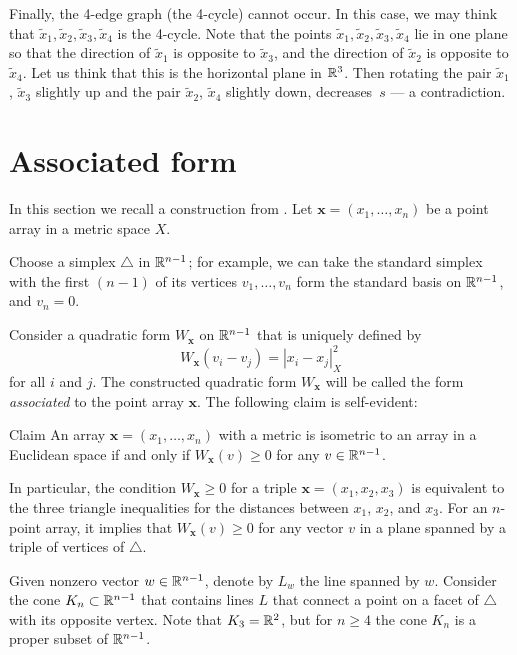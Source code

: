 \documentclass{article}
\begin{document}
Finally, the 4-edge graph (the 4-cycle) cannot occur.
In this case, we may think that $\tilde x_1,\tilde x_2,\tilde x_3,\tilde x_4$ is the 4-cycle.
Note that the points $\tilde x_1,\tilde x_2,\tilde x_3,\tilde x_4$  lie in one plane so that the direction of $\tilde x_1$ is opposite to $\tilde x_3$,
and the direction of $\tilde x_2$ is opposite to $\tilde x_4$.
Let us think that this is the horizontal plane in $\mathbb{R}^3$.
Then rotating the pair $\tilde x_1$, $\tilde x_3$ slightly up and 
the pair $\tilde x_2$, $\tilde x_4$  slightly down, decreases~$s$ --- a contradiction.
\qeds

\section{Associated form}

In this section we recall a construction from \cite{petrunin-2017}.
Let $\bm{x}=(x_1,\dots,x_n)$ be a point array in a metric space $X$.

Choose a simplex $\triangle$ in $\mathbb{R}^{n-1}$; for example, we can take the standard simplex with the first $(n-1)$ of its vertices $v_1,\dots,v_n$ form the standard basis on $\mathbb{R}^{n-1}$, and $v_n=0$.

Consider a quadratic form $W_{\bm{x}}$ on $\mathbb{R}^{n-1}$ that is uniquely defined by
\[W_{\bm{x}}(v_i-v_j)=|x_i-x_j|^2_X\] 
for all $i$ and $j$.
The constructed quadratic form $W_{\bm{x}}$ will be called
the form \emph{associated} to the point array $\bm{x}$.
The following claim is self-evident:

\begin{thm}{Claim}\label{clm:W>=0}
An array $\bm{x}=(x_1,\dots,x_n)$ with a metric is isometric to an array in a Euclidean space if and only if 
$W_{\bm{x}}(v)\ge 0$
for any $v\in \mathbb{R}^{n-1}$.
\end{thm}


In particular, the condition $W_{\bm{x}}\ge 0$ for a triple $\bm{x}=(x_1,x_2,x_3)$ is equivalent to 
the three triangle inequalities for the distances between $x_1$, $x_2$, and $x_3$.
For an $n$-point array, it implies that $W_{\bm{x}}(v)\ge 0$ for any vector $v$ in a plane spanned by a triple of vertices of $\triangle$.

Given nonzero vector $w\in\mathbb{R}^{n-1}$, denote by $L_w$ the line spanned by $w$.
Consider the cone $K_n\subset \mathbb{R}^{n-1}$ that contains lines $L$ that connect a point on a facet of $\triangle$ with its opposite vertex.
Note that $K_3=\mathbb{R}^2$, but for $n\ge 4$ the cone $K_n$ is a proper subset of $\mathbb{R}^{n-1}$.
\end{document}
